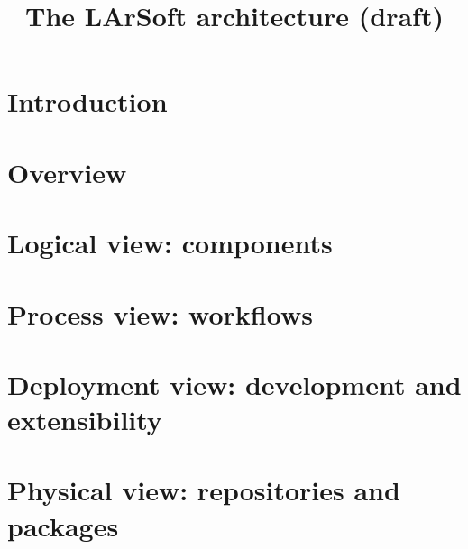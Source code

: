 \documentclass{article}
\begin{document}
\title{The LArSoft architecture (draft)}

\maketitle

\linenumbers

\tableofcontents

\section{Introduction}
\label{sec:introduction}




\section{Overview}
\label{sec:Overview}




\section{Logical view: components}
\label{sec:Components}




\section{Process view: workflows}
\label{sec:Workflows}




\section{Deployment view: development and extensibility}
\label{sec:Development}




\section{Physical view: repositories and packages}
\label{sec:Packages}








\clearpage
\appendix


% 
% 
\end{document}
